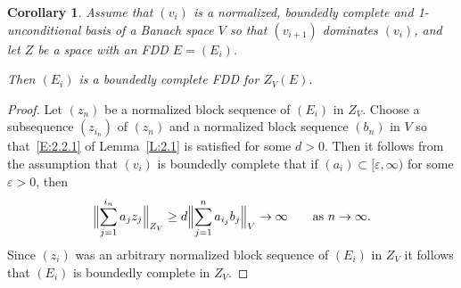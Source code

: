 \documentclass[11pt,leqno]{amsart}
\newtheorem{cor}[thm]{Corollary}
\theoremstyle{definition}
\newcommand{\vp}{\varepsilon}
\begin{document}
\begin{cor}
  \label{C:2.1a}
  Assume that $(v_i)$ is a normalized, boundedly complete and
  1-unconditional basis of a Banach space $V$ so that $(v_{i+1})$
  dominates $(v_i)$, and let $Z$ be a space with an FDD $E=(E_i)$.

  Then $(E_i)$  is a boundedly complete FDD for $Z_V(E)$.
\end{cor}
\begin{proof}
  Let $(z_n)$ be a normalized block sequence of $(E_i)$ in
  $Z_V$. Choose a subsequence $(z_{i_n})$ of $(z_n)$ and a normalized
  block sequence $(b_n)$ in $V$ so that~\eqref{E:2.2.1} of
  Lemma~\ref{L:2.1} is
  satisfied for some $d>0$. Then it follows from the assumption that
  $(v_i)$ is boundedly complete that if $(a_i)\subset [\vp,\infty)$
  for some $\vp>0$, then
  $$\Bigl\|\sum_{j=1}^{i_n} a_j z_j\Bigr\|_{Z_V}\ge d
  \Bigl\|\sum_{j=1}^{n}a_{i_j} b_j\Bigr\|_V\to\infty\qquad\text{as
  }n\to\infty.$$
  Since $(z_i)$ was an arbitrary normalized
  block sequence of $(E_i)$ in $Z_V$
  it follows that $(E_i)$ is boundedly
  complete in $Z_V$.
\end{proof}
\end{document}
